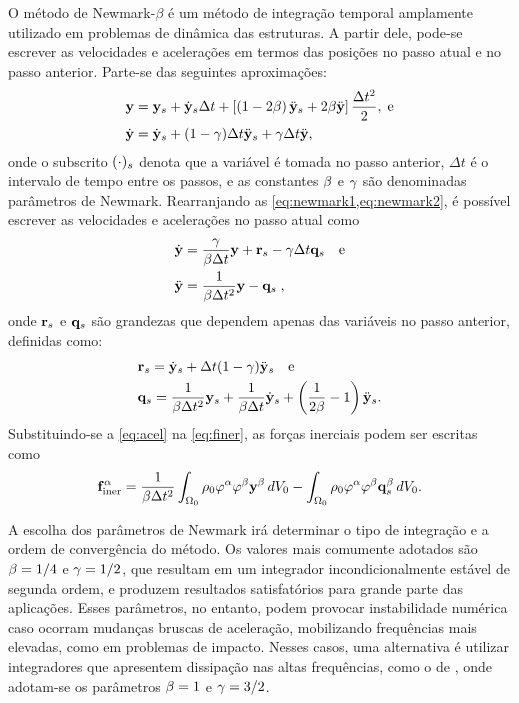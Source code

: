 \documentclass[Tese.tex]{subfiles}
\begin{document}
O método de Newmark-$\beta$ \cite{newmark1959method} é um método de integração temporal amplamente utilizado em problemas de dinâmica das estruturas. A partir dele, pode-se escrever as velocidades e acelerações em termos das posições no passo atual e no passo anterior. Parte-se das seguintes aproximações:
\begin{align}
&\mathbf{y} = \mathbf{y}_{s} + \dot{\mathbf{y}}_{s}\Delta t + \left[\left(1-2\beta\right)\ddot{\mathbf{y}}_{s} + 2\beta\ddot{\mathbf{y}}\right] \dfrac{\Delta t^2}{2}, \text{\;e} \label{eq:newmark1}\\
&\dot{\mathbf{y}} = \dot{\mathbf{y}}_{s} + (1-\gamma)\Delta t\ddot{\mathbf{y}}_{s} +\gamma\Delta t \ddot{\mathbf{y}}, \label{eq:newmark2}
\end{align}
onde o subscrito $(\cdot)_{s}$ denota que a variável é tomada no passo anterior, $\Delta t$ é o intervalo de tempo entre os passos, e as constantes $\beta$ e $\gamma$ são denominadas parâmetros de Newmark. Rearranjando as \cref{eq:newmark1,eq:newmark2}, é possível escrever as velocidades e acelerações no passo atual como
\begin{align}
&\dot{\mathbf{y}} = \dfrac{\gamma}{\beta\Delta t}\mathbf{y} + \mathbf{r}_{s} - \gamma\Delta t\mathbf{q}_{s} \text{\quad e}  \label{eq:vel}\\
&\ddot{\mathbf{y}} = \dfrac{1}{\beta\Delta t^2}\mathbf{y} - \mathbf{q}_{s}\;,\label{eq:acel}
\end{align}
onde $\mathbf{r}_{s}$ e $\mathbf{q}_{s}$ são grandezas que dependem apenas das variáveis no passo anterior, definidas como:
\begin{align}
&\mathbf{r}_{s} = \dot{\mathbf{y}}_{s}+\Delta t(1-\gamma)\ddot{\mathbf{y}}_{s}\text{\quad e} \label{eq:rs}\\
&\mathbf{q}_{s} = \dfrac{1}{\beta\Delta t^2}\mathbf{y}_{s} + \dfrac{1}{\beta\Delta t}\dot{\mathbf{y}}_{s} + \left(\dfrac{1}{2\beta}-1\right)\ddot{\mathbf{y}}_{s}.  \label{eq:qs} 
\end{align}
Substituindo-se a \cref{eq:acel} na \cref{eq:finer}, as forças inerciais podem ser escritas como
\begin{equation}
\mathbf{f}_\text{iner}^\alpha = \dfrac{1}{\beta\Delta t^2}\int_{\Omega_0}\rho_0\varphi^\alpha\varphi^\beta\mathbf{y}^\beta\,dV_0 - \int_{\Omega_0}\rho_0\varphi^\alpha\varphi^\beta\mathbf{q}_{s}^\beta\,dV_0 .\label{eq:finer2}
\end{equation}

A escolha dos parâmetros de Newmark irá determinar o tipo de integração e a ordem de convergência do método. Os valores mais comumente adotados são $\beta=1/4$ e $\gamma=1/2$, que resultam em um integrador incondicionalmente estável de segunda ordem, e produzem resultados satisfatórios para grande parte das aplicações. Esses parâmetros, no entanto, podem provocar instabilidade numérica caso ocorram mudanças bruscas de aceleração, mobilizando frequências mais elevadas, como em problemas de impacto. Nesses casos, uma alternativa é utilizar integradores que apresentem dissipação nas altas frequências, como o de , onde adotam-se os parâmetros $\beta=1$ e $\gamma=3/2$.
\end{document}
